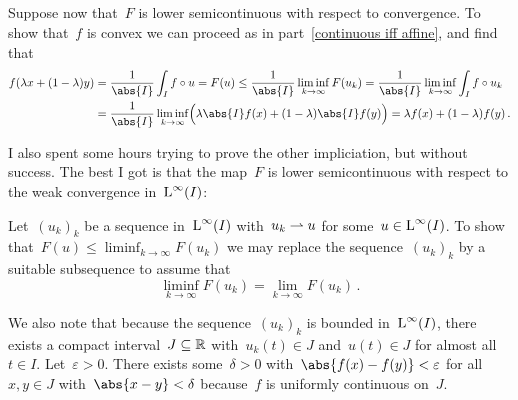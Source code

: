 \subsection{}

Suppose now that~$F$ is lower semicontinuous with respect to {\weakstar} convergence.
To show that~$f$ is convex we can proceed as in part~\ref{continuous iff affine}, and find that
\begin{align*}
  f( \lambda x + (1-\lambda) y )
  &=
  \frac{1}{\abs{I}} \int_I f \circ u
  =
  F(u)
  \leq
  \frac{1}{\abs{I}} \liminf_{k \to \infty} F(u_k)
  =
  \frac{1}{\abs{I}} \liminf_{k \to \infty} \int_I f \circ u_k
  \\
  &=
  \frac{1}{\abs{I}}
  \liminf_{k \to \infty} \Bigl( \lambda \abs{I} f(x) + (1 - \lambda) \abs{I} f(y) \Bigr)
  =
  \lambda f(x) + (1 - \lambda) f(y) \,.
\end{align*}

I also spent some hours trying to prove the other impliciation, but without success.
The best I got is that the map~$F$ is lower semicontinuous with respect to the weak convergence in~$\operatorname{L}^\infty(I)$:

Let~$(u_k)_k$ be a sequence in~$\operatorname{L}^\infty(I)$ with~$u_k \rightharpoonup u$ for some~$u \in \operatorname{L}^\infty(I)$.
To show that~$F(u) \leq \liminf_{k \to \infty} F(u_k)$ we may replace the sequence~$(u_k)_k$ by a suitable subsequence to assume that
\begin{equation}
  \label{liminf is lim}
  \liminf_{k \to \infty} F(u_k)
  =
  \lim_{k \to \infty} F(u_k) \,.
\end{equation}

We also note that because the sequence~$(u_k)_k$ is bounded in~$\operatorname{L}^\infty(I)$, there exists a compact interval~$J \subseteq \mathbb{R}$ with~$u_k(t) \in J$ and~$u(t) \in J$ for almost all~$t \in I$.
Let~$\varepsilon > 0$.
There exists some~$\delta > 0$ with~$\abs{f(x) - f(y)} < \varepsilon$ for all~$x, y \in J$ with~$\abs{x - y} < \delta$ because~$f$ is uniformly continuous on~$J$.

